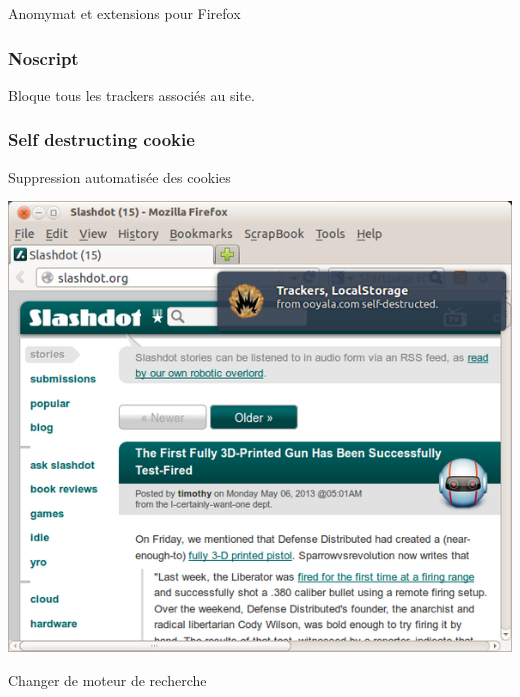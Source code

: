 \begin{frame}
\begin{center}
\Huge{Anomymat et extensions pour Firefox}
\end{center}
\end{frame}


\begin{frame}
\frametitle{Noscript}

Bloque tous les trackers associés au site.

\begin{center}

\end{center}
\end{frame}


\begin{frame}
\frametitle{Self destructing cookie}

Suppression automatisée des cookies

\begin{center}
\includegraphics[scale=0.4] {./materials/selfdestructingcookie.png}
\end{center}
\end{frame}

\begin{frame}
\begin{center}
\Huge{Changer de moteur de recherche}
\end{center}
\end{frame}

